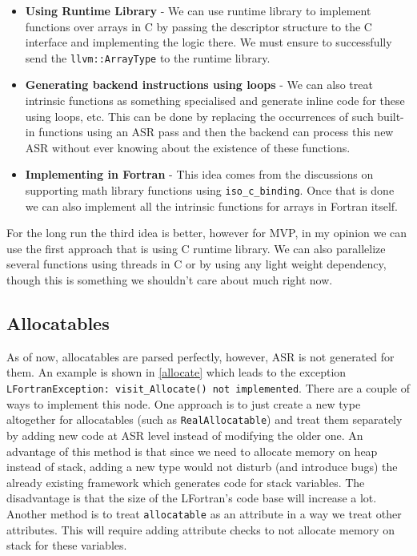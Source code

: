 \begin{itemize}

\item \textbf{Using Runtime Library} - We can use runtime library to implement functions over arrays in C by passing the descriptor structure to the C interface and implementing the logic there. We must ensure to successfully send the \texttt{llvm::ArrayType} to the runtime library.

\item \textbf{Generating backend instructions using loops} - We can also treat intrinsic functions as something specialised and generate inline code for these using loops, etc. This can be done by replacing the occurrences of such built-in functions using an ASR pass and then the backend can process this new ASR without ever knowing about the existence of these functions.

\item \textbf{Implementing in Fortran} - This idea comes from the discussions on supporting math library functions using \texttt{iso\_c\_binding}. Once that is done we can also implement all the intrinsic functions for arrays in Fortran itself.

\end{itemize}

For the long run the third idea is better, however for MVP, in my opinion we can use the first approach that is using C runtime library. We can also parallelize several functions using threads in C or by using any light weight dependency, though this is something we shouldn't care about much right now.

\subsection{Allocatables}

As of now, allocatables are parsed perfectly, however, ASR is not generated for them. An example is shown in \ref{allocate} which leads to the exception \texttt{LFortranException: visit\_Allocate() not implemented}. There are a couple of ways to implement this node. One approach is to just create a new type altogether for allocatables (such as \texttt{RealAllocatable}) and treat them separately by adding new code at ASR level instead of modifying the older one. An advantage of this method is that since we need to allocate memory on heap instead of stack, adding a new type would not disturb (and introduce bugs) the already existing framework which generates code for stack variables. The disadvantage is that the size of the LFortran's code base will increase a lot. Another method is to treat \texttt{allocatable} as an attribute in a way we treat other attributes. This will require adding attribute checks to not allocate memory on stack for these variables.

